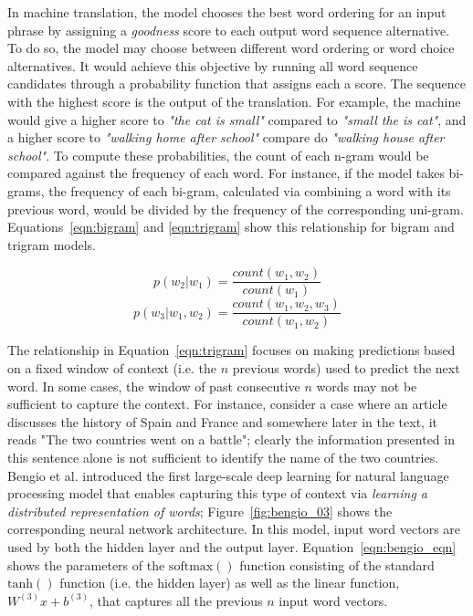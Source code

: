 \documentclass{tufte-handout}
\begin{document}
In machine translation, the model chooses the best word ordering for an input phrase by assigning a \textit{goodness} score to each output word sequence alternative. To do so, the model may choose between different word ordering or word choice alternatives. It would achieve this objective by running all word sequence candidates through a probability function that assigns each a score. The sequence with the highest score is the output of the translation. For example, the machine would give a higher score to \textit{"the cat is small"} compared to \textit{"small the is cat"}, and a higher score to \textit{"walking home after school"} compare do \textit{"walking house after school"}. To compute these probabilities, the count of each n-gram would be compared against the frequency of each word. For instance, if the model takes bi-grams, the frequency of each bi-gram, calculated via combining a word with its previous word, would be divided by the frequency of the corresponding uni-gram. Equations~\ref{eqn:bigram} and \ref{eqn:trigram} show this relationship for bigram and trigram models.

\begin{equation}
	p(w_2 | w_1) = \dfrac {count(w_1,w_2)}{count(w_1)}
	\label{eqn:bigram}
\end{equation}
\begin{equation}
	p(w_3 | w_1, w_2) = \dfrac {count(w_1,w_2,w_3)}{count(w_1, w_2)}
	\label{eqn:trigram}
\end{equation}

The relationship in Equation~\ref{eqn:trigram} focuses on making predictions based on a fixed window of context (i.e. the $n$ previous words) used to predict the next word. In some cases, the window of past consecutive $n$ words may not be sufficient to capture the context. For instance, consider a case where an article discusses the history of Spain and France and somewhere later in the text, it reads "The two countries went on a battle"; clearly the information presented in this sentence alone is not sufficient to identify the name of the two countries. Bengio et al. introduced the first large-scale deep learning for natural language processing model that enables capturing this type of context via \textit{learning a distributed representation of words}; Figure~\ref{fig:bengio_03} shows the corresponding neural network architecture. In this model, input word vectors are used by both the hidden layer and the output layer. 
Equation~\ref{eqn:bengio_eqn} shows the parameters of the $\operatorname{softmax()}$ function consisting of the standard $\operatorname{tanh()}$ function (i.e. the hidden layer) as well as the linear function, $W^{(3)}x+b^{(3)}$, that captures all the previous $n$ input word vectors.
\end{document}
